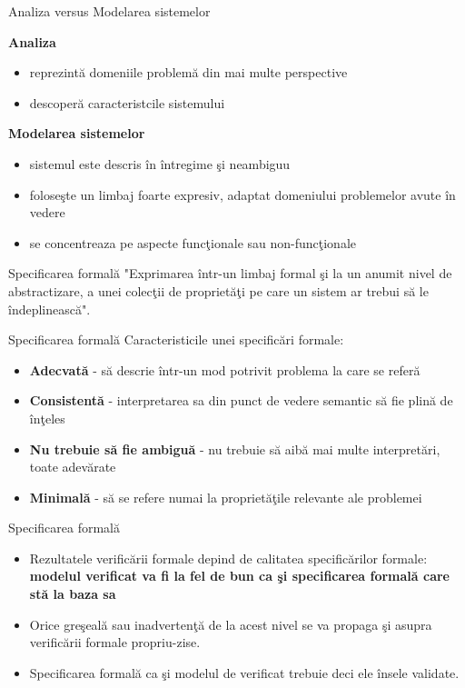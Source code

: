 \documentclass{beamer}
\begin{document}
\begin{frame}{Analiza versus Modelarea sistemelor}

\textbf{Analiza}
\begin{itemize}
\item
reprezintă domeniile problemă din mai multe perspective
\item
descoperă caracteristcile sistemului
\end{itemize}

\textbf{Modelarea sistemelor}
\begin{itemize}
\item
sistemul este descris în întregime şi neambiguu
\item
foloseşte un limbaj foarte expresiv, adaptat domeniului problemelor avute în vedere
\item
se concentreaza pe aspecte funcţionale sau non-funcţionale
\end{itemize}

\end{frame}



\begin{frame}{Specificarea formală}
"Exprimarea într-un limbaj formal şi la un anumit nivel de abstractizare, a unei colecţii de proprietăţi pe care un sistem ar trebui să le îndeplinească".

\end{frame}



\begin{frame}{Specificarea formală}
Caracteristicile unei specificări formale:

\begin{itemize}
\item
\textbf{Adecvată} - să descrie într-un mod potrivit problema la care se referă
\item
\textbf{Consistentă} - interpretarea sa din punct de vedere semantic să fie plină de înţeles
\item
\textbf{Nu trebuie să fie ambiguă} - nu trebuie să aibă mai multe interpretări, toate adevărate
\item
\textbf{Minimală} - să se refere numai la proprietăţile relevante ale problemei
\end{itemize}
\end{frame}



\begin{frame}{Specificarea formală}
\begin{itemize}
\item
Rezultatele verificării formale depind de calitatea specificărilor formale: \textbf{modelul verificat va fi la fel de bun ca şi specificarea formală care stă la baza sa}
\item
Orice greşeală sau inadvertenţă de la acest nivel se va propaga şi asupra verificării formale propriu-zise.
\item
Specificarea formală ca şi modelul de verificat trebuie deci ele însele validate.
\end{itemize}
\end{frame}
\end{document}
